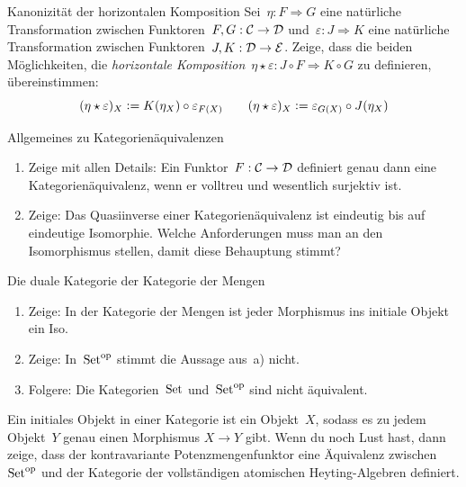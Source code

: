 \documentclass{uebblatt}
\begin{document}
\begin{aufgabe}{Kanonizität der horizontalen Komposition}
Sei~$\eta : F \Rightarrow G$ eine natürliche Transformation zwischen
Funktoren~$F,G : \mathcal{C} \to \mathcal{D}$ und~$\varepsilon : J \Rightarrow K$ eine natürliche
Transformation zwischen Funktoren~$J,K : \mathcal{D} \to \mathcal{E}$. Zeige, dass die beiden
Möglichkeiten, die \emph{horizontale Komposition}~$\eta \star \varepsilon : J
\circ F \Rightarrow K \circ G$ zu definieren, übereinstimmen:
\[ (\eta \star \varepsilon)_X \vcentcolon= K(\eta_X) \circ \varepsilon_{F(X)}
  \qquad
  (\eta \star \varepsilon)_X \vcentcolon= \varepsilon_{G(X)} \circ J(\eta_X)
\]
\end{aufgabe}
\vspace{-2em}

\begin{aufgabe}{Allgemeines zu Kategorienäquivalenzen}
\begin{enumerate}
\item Zeige mit allen Details: Ein Funktor~$F : \mathcal{C} \to \mathcal{D}$ definiert genau dann
eine Kategorien\-äquivalenz, wenn er volltreu und wesentlich surjektiv ist.
\item Zeige: Das Quasiinverse einer Kategorienäquivalenz ist eindeutig bis auf
eindeutige Isomorphie. Welche Anforderungen muss man an den Isomorphismus
stellen, damit diese Behauptung stimmt?
\end{enumerate}
\end{aufgabe}

\begin{aufgabe}{Die duale Kategorie der Kategorie der Mengen}
\begin{enumerate}
\item Zeige: In der Kategorie der Mengen ist jeder Morphismus ins initiale
Objekt ein Iso.
\item Zeige: In~$\mathrm{Set}^{\mathrm{op}}$ stimmt die Aussage aus~a) nicht.
\item Folgere: Die Kategorien~$\mathrm{Set}$ und~$\mathrm{Set}^{\mathrm{op}}$ sind nicht äquivalent.
\end{enumerate}
\begin{minipage}{0.87\textwidth}
\tiny Ein initiales Objekt in einer Kategorie ist ein Objekt~$X$, sodass es zu
jedem Objekt~$Y$ genau einen Morphismus $X \to Y$ gibt.
Wenn du noch Lust hast, dann zeige, dass der kontravariante
Potenzmengenfunktor eine Äquivalenz zwischen~$\mathrm{Set}^{\mathrm{op}}$ und der Kategorie der
vollständigen atomischen Heyting-Algebren definiert.\par
\end{minipage}
\end{aufgabe}
\end{document}
